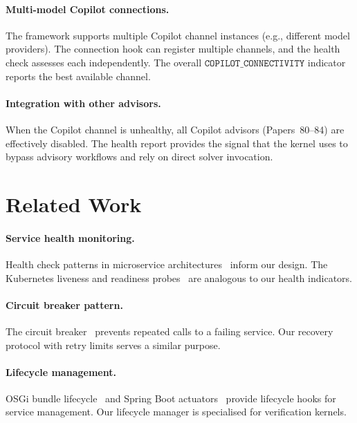 \documentclass[11pt]{article}
\begin{document}
\paragraph{Multi-model Copilot connections.}
The framework supports multiple Copilot channel instances
(e.g., different model providers).  The connection hook can
register multiple channels, and the health check assesses
each independently.  The overall $\texttt{COPILOT\_CONNECTIVITY}$
indicator reports the best available channel.

\paragraph{Integration with other advisors.}
When the Copilot channel is unhealthy, all Copilot advisors
(Papers~80--84) are effectively disabled.  The health report
provides the signal that the kernel uses to bypass advisory
workflows and rely on direct solver invocation.

\section{Related Work}\label{sec:related}

\paragraph{Service health monitoring.}
Health check patterns in microservice
architectures~\cite{newman2015microservices} inform
our design.  The Kubernetes liveness and readiness
probes~\cite{burns2018kubernetes} are analogous to
our health indicators.

\paragraph{Circuit breaker pattern.}
The circuit breaker~\cite{nygard2018release} prevents
repeated calls to a failing service.  Our recovery
protocol with retry limits serves a similar purpose.

\paragraph{Lifecycle management.}
OSGi bundle lifecycle~\cite{hall2011osgi} and Spring
Boot actuators~\cite{webb2023spring} provide lifecycle
hooks for service management.  Our lifecycle manager
is specialised for verification kernels.
\end{document}
